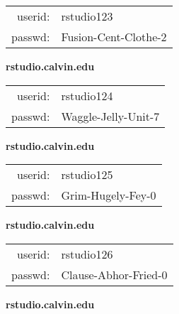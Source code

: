 \documentclass{article}\usepackage[]{graphicx}\usepackage[]{color}
\begin{document}
\begin{multicols}{3}
\begin{minipage}{.3\textwidth}
\begin{tabular}{rl}
userid: & rstudio123\\
passwd: & Fusion-Cent-Clothe-2

\vspace{5mm}

\end{tabular}\end{minipage}

\vspace{5mm}

\begin{minipage}{.3\textwidth}
\centerline{\textbf{rstudio.calvin.edu}}
\medskip
\begin{tabular}{rl}

userid: & rstudio124\\
passwd: & Waggle-Jelly-Unit-7

\vspace{5mm}

\end{tabular}\end{minipage}

\vspace{5mm}

\begin{minipage}{.3\textwidth}
\centerline{\textbf{rstudio.calvin.edu}}
\medskip
\begin{tabular}{rl}

userid: & rstudio125\\
passwd: & Grim-Hugely-Fey-0

\vspace{5mm}

\end{tabular}\end{minipage}

\vspace{5mm}

\begin{minipage}{.3\textwidth}
\centerline{\textbf{rstudio.calvin.edu}}
\medskip
\begin{tabular}{rl}

userid: & rstudio126\\
passwd: & Clause-Abhor-Fried-0

\vspace{5mm}

\end{tabular}\end{minipage}

\vspace{5mm}

\begin{minipage}{.3\textwidth}
\centerline{\textbf{rstudio.calvin.edu}}
\medskip
\begin{tabular}{rl}


\end{tabular}
\end{minipage}
\end{multicols}
\end{document}
